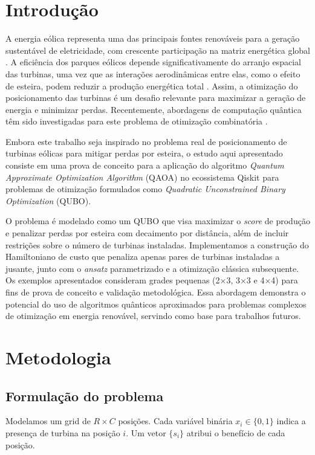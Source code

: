 \documentclass{weciq}
\begin{document}
\section{Introdu\c{c}\~{a}o}

A energia eólica representa uma das principais fontes renováveis para a geração sustentável de eletricidade, com crescente participação na matriz energética global \cite{GWEC2017, IRENA2017}. A eficiência dos parques eólicos depende significativamente do arranjo espacial das turbinas, uma vez que as interações aerodinâmicas entre elas, como o efeito de esteira, podem reduzir a produção energética total \cite{Jensen1983, Barthelmie2009}. Assim, a otimização do posicionamento das turbinas é um desafio relevante para maximizar a geração de energia e minimizar perdas. Recentemente, abordagens de computação quântica têm sido investigadas para este problema de otimização combinatória \cite{Kagemoto2024}.

Embora este trabalho seja inspirado no problema real de posicionamento de turbinas eólicas para mitigar perdas por esteira, o estudo aqui apresentado consiste em uma prova de conceito para a aplicação do algoritmo \textit{Quantum Approximate Optimization Algorithm} (QAOA) no ecossistema Qiskit para problemas de otimização formulados como \textit{Quadratic Unconstrained Binary Optimization} (QUBO).

O problema é modelado como um QUBO que visa maximizar o \textit{score} de produção e penalizar perdas por esteira com decaimento por distância, além de incluir restrições sobre o número de turbinas instaladas. Implementamos a construção do Hamiltoniano de custo que penaliza apenas pares de turbinas instaladas a jusante, junto com o \textit{ansatz} parametrizado e a otimização clássica subsequente. Os exemplos apresentados consideram grades pequenas (2×3, 3×3 e 4×4) para fins de prova de conceito e validação metodológica. Essa abordagem demonstra o potencial do uso de algoritmos quânticos aproximados para problemas complexos de otimização em energia renovável, servindo como base para trabalhos futuros.

\section{Metodologia}
\subsection{Formula\c{c}\~{a}o do problema}
Modelamos um grid de $R\times C$ posições. Cada variável binária $x_i\in\{0,1\}$ indica a presença de turbina na posição $i$. Um vetor $\{s_i\}$ atribui o benefício de cada posição. 
\end{document}
